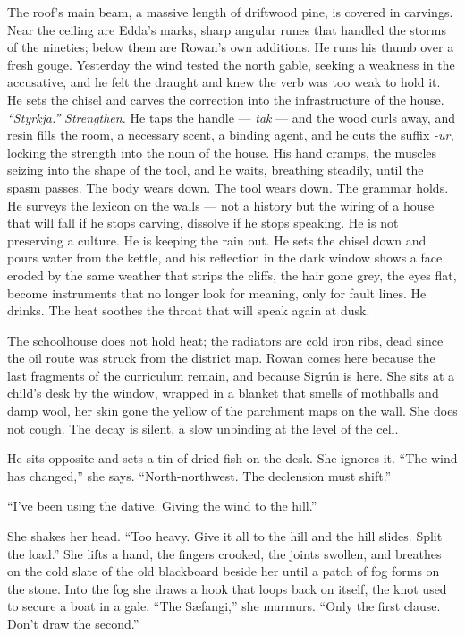 \documentclass[11pt,oneside]{book}
\newcommand{\sceneline}{%
  \par\vspace{1.2em}
  \begin{center}
    \fontsize{11}{11}\selectfont \textbullet\quad\textbullet\quad\textbullet
  \end{center}
  \vspace{0.6em}\noindent\ignorespaces
}
\begin{document}
The roof's main beam, a massive length of driftwood pine, is covered in
carvings. Near the ceiling are Edda's marks, sharp angular runes that
handled the storms of the nineties; below them are Rowan's own
additions. He runs his thumb over a fresh gouge. Yesterday the wind
tested the north gable, seeking a weakness in the accusative, and he
felt the draught and knew the verb was too weak to hold it. He sets the
chisel and carves the correction into the infrastructure of the house.
\emph{``Styrkja.''} \emph{Strengthen.} He taps the handle --- \emph{tak}
--- and the wood curls away, and resin fills the room, a necessary
scent, a binding agent, and he cuts the suffix \emph{-ur,} locking the
strength into the noun of the house. His hand cramps, the muscles
seizing into the shape of the tool, and he waits, breathing steadily,
until the spasm passes. The body wears down. The tool wears down. The
grammar holds. He surveys the lexicon on the walls --- not a history but
the wiring of a house that will fall if he stops carving, dissolve if he
stops speaking. He is not preserving a culture. He is keeping the rain
out. He sets the chisel down and pours water from the kettle, and his
reflection in the dark window shows a face eroded by the same weather
that strips the cliffs, the hair gone grey, the eyes flat, become
instruments that no longer look for meaning, only for fault lines. He
drinks. The heat soothes the throat that will speak again at dusk.

\sceneline

The schoolhouse does not hold heat; the radiators are cold iron ribs,
dead since the oil route was struck from the district map. Rowan comes
here because the last fragments of the curriculum remain, and because
Sigrún is here. She sits at a child's desk by the window, wrapped in a
blanket that smells of mothballs and damp wool, her skin gone the yellow
of the parchment maps on the wall. She does not cough. The decay is
silent, a slow unbinding at the level of the cell.

He sits opposite and sets a tin of dried fish on the desk. She ignores
it. ``The wind has changed,'' she says. ``North-northwest. The
declension must shift.''

``I've been using the dative. Giving the wind to the hill.''

She shakes her head. ``Too heavy. Give it all to the hill and the hill
slides. Split the load.'' She lifts a hand, the fingers crooked, the
joints swollen, and breathes on the cold slate of the old blackboard
beside her until a patch of fog forms on the stone. Into the fog she
draws a hook that loops back on itself, the knot used to secure a boat
in a gale. ``The Sæfangi,'' she murmurs. ``Only the first clause. Don't
draw the second.''
\end{document}
